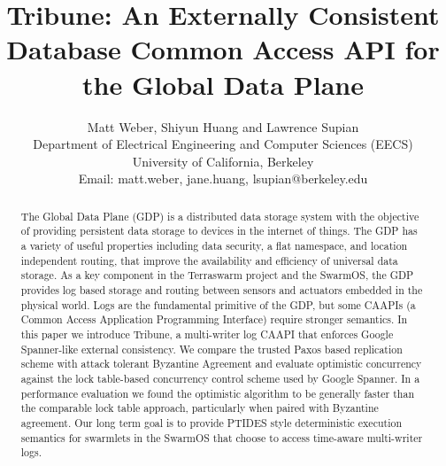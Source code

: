 \documentclass[10pt,twocolumn]{article}
\begin{document}
\title{Tribune: An Externally Consistent Database Common Access API for the Global Data Plane}
\author{Matt Weber, Shiyun Huang and Lawrence Supian\\
Department of Electrical Engineering and Computer Sciences (EECS) \\
University of California, Berkeley\\
Email: matt.weber, jane.huang, lsupian@berkeley.edu
}

\maketitle
\thispagestyle{empty}

\begin{abstract}
	The Global Data Plane (GDP) is a distributed data storage system with the objective of providing persistent data storage to devices in the internet of things. The GDP has a variety of useful properties including data security, a flat namespace, and location independent routing, that improve the availability and efficiency of universal data storage. As a key component in the Terraswarm project and the SwarmOS, the GDP provides log based storage and routing between sensors and actuators embedded in the physical world. Logs are the fundamental primitive of the GDP, but some CAAPIs (a Common Access Application Programming Interface) require stronger semantics. In this paper we introduce Tribune, a multi-writer log CAAPI that enforces Google Spanner-like external consistency. We compare the trusted Paxos based replication scheme with attack tolerant Byzantine Agreement and evaluate optimistic concurrency against the lock table-based concurrency control scheme used by Google Spanner. In a performance evaluation we found the optimistic algorithm to be generally faster than the comparable lock table approach, particularly when paired with Byzantine agreement. Our long term goal is to provide PTIDES style deterministic execution semantics for swarmlets in the SwarmOS that choose to access time-aware multi-writer logs.
\end{abstract}
\end{document}
